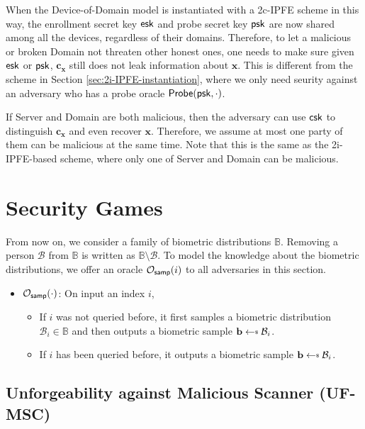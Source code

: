 When the Device-of-Domain model is instantiated with a 2c-IPFE scheme in this way, the enrollment secret key ${\sf esk}$ and probe secret key ${\sf psk}$ are now shared among all the devices, regardless of their domains. Therefore, to let a malicious or broken {\sf Domain} not threaten other honest ones, one needs to make sure given ${\sf esk}$ or ${\sf psk}$, $\mathbf{c_x}$ still does not leak information about $\mathbf{x}$. This is different from the scheme in Section \ref{sec:2i-IPFE-instantiation}, where we only need seurity against an adversary who has a probe oracle ${\sf Probe}({\sf psk}, \cdot)$.

If {\sf Server} and {\sf Domain} are both malicious, then the adversary can use ${\sf csk}$ to distinguish $\mathbf{c_x}$ and even recover $\mathbf{x}$. Therefore, we assume at most one party of them can be malicious at the same time. Note that this is the same as the 2i-IPFE-based scheme, where only one of {\sf Server} and {\sf Domain} can be malicious.



\section{Security Games}

From now on, we consider a family of biometric distributions $\mathbb{B}$. Removing a person $\mathcal{B}$ from $\mathbb{B}$ is written as $\mathbb{B} \setminus \mathcal{B}$. To model the knowledge about the biometric distributions, we offer an oracle $\mathcal{O}_{\sf samp}(i)$ to all adversaries in this section.

\begin{itemize}
	\item $\mathcal{O}_{\sf samp}(\cdot)$: On input an index $i$,
	\begin{itemize}
		\item If $i$ was not queried before, it first samples a biometric distribution $\mathcal{B}_i \in \mathbb{B}$ and then outputs a biometric sample $\mathbf{b} \getsdollar \mathcal{B}_i$.
		\item If $i$ has been queried before, it outputs a biometric sample $\mathbf{b} \getsdollar \mathcal{B}_i$.
	\end{itemize}
\end{itemize}



\subsection{Unforgeability against Malicious Scanner (UF-MSC)}
\label{sec:uf-msc_game}

